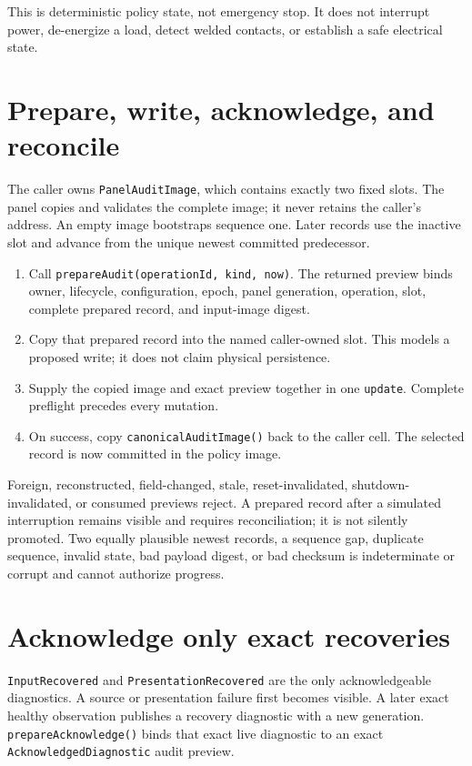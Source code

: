 \documentclass[10pt]{article}
\begin{document}
This is deterministic policy state, not emergency stop. It does not interrupt
power, de-energize a load, detect welded contacts, or establish a safe
electrical state.

\section{Prepare, write, acknowledge, and reconcile}
The caller owns \texttt{PanelAuditImage}, which contains exactly two fixed
slots. The panel copies and validates the complete image; it never retains the
caller's address. An empty image bootstraps sequence one. Later records use the
inactive slot and advance from the unique newest committed predecessor.

\begin{enumerate}
 \item Call \texttt{prepareAudit(operationId, kind, now)}. The returned
       preview binds owner, lifecycle, configuration, epoch, panel generation,
       operation, slot, complete prepared record, and input-image digest.
 \item Copy that prepared record into the named caller-owned slot. This models
       a proposed write; it does not claim physical persistence.
 \item Supply the copied image and exact preview together in one
       \texttt{update}. Complete preflight precedes every mutation.
 \item On success, copy \texttt{canonicalAuditImage()} back to the caller cell.
       The selected record is now committed in the policy image.
\end{enumerate}

Foreign, reconstructed, field-changed, stale, reset-invalidated,
shutdown-invalidated, or consumed previews reject. A prepared record after a
simulated interruption remains visible and requires reconciliation; it is not
silently promoted. Two equally plausible newest records, a sequence gap,
duplicate sequence, invalid state, bad payload digest, or bad checksum is
indeterminate or corrupt and cannot authorize progress.

\section{Acknowledge only exact recoveries}
\texttt{InputRecovered} and \texttt{PresentationRecovered} are the only
acknowledgeable diagnostics. A source or presentation failure first becomes
visible. A later exact healthy observation publishes a recovery diagnostic
with a new generation. \texttt{prepareAcknowledge()} binds that exact live
diagnostic to an exact \texttt{AcknowledgedDiagnostic} audit preview.
\end{document}
